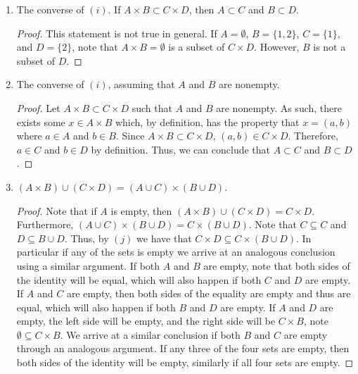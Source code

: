 \documentclass[12pt]{article}
\begin{document}
\begin{enumerate}[label=(\alph*)]
\begin{proof}
		Let $x \in A \times B$. By definition, $x = (a, b)$ such that $a \in A$ and $b \in B$.
		By assumption, we have that $a \in C$ and $b \in D$ since $A \subset C$ and 
		$B \subset D$. Therefore, we have that $(a, b) \in C \times D$. Thus, we conclude
		that $A \times B \subset C \times D$.
	\end{proof}
	\item The converse of $(i)$. If $A \times B \subset C \times D$, then 
	$A \subset C$ and $B \subset D$.
	\begin{proof}
		This statement is not true in general. If $A = \emptyset$, $B = \{1, 2\}$,
		$C = \{1\}$, and $D = \{2\}$, note that $A \times B = \emptyset$ is a subset
			of $C \times D$. However, $B$ is not a subset of $D$. 
	\end{proof}
	\item The converse of $(i)$, assuming that $A$ and $B$ are nonempty.
	\begin{proof}
		Let $A \times B \subset C \times D$ such that $A$ and $B$ are nonempty.
		As such, there exists some $x \in A \times B$ which, by definition, 
		has the property that $x = (a, b)$ where $a \in A$ and $b \in B$. Since 
		$A \times B \subset C \times D$, $(a, b) \in C \times D$. Therefore,
		$a \in C$ and $b \in D$ by definition. Thus, we can conclude that 
		$A \subset C$ and $B \subset D$.
	\end{proof}
	\item $(A \times B) \cup (C \times D) = (A \cup C) \times (B \cup D)$.
	\begin{proof}
		Note that if $A$ is empty, then $(A \times B) \cup (C \times D) = C \times D$.
		Furthermore, $(A \cup C) \times (B \cup D) = C \times (B \cup D)$. Note that 
		$C \subseteq C$ and $D \subseteq B \cup D$. Thus, by $(j)$ we have that 
		$C \times D \subseteq C \times (B \cup D)$. In particular if any of the sets is 
		empty we arrive at an analogous conclusion using a similar argument. If both 
		$A$ and $B$ are empty, note that both sides of the identity will be equal, 
		which will also happen if both $C$ and $D$ are empty. If $A$ and $C$ are empty,
		then both sides of the equality are empty and thus are equal, which will also happen
		if both $B$ and $D$ are empty. If $A$ and $D$ are empty, the left side will be empty,
		and the right side will be $C \times B$, note $\emptyset \subseteq C \times B$.
		We arrive at a similar conclusion if both $B$ and $C$ are empty through an 
		analogous argument. If any three of the four sets are empty, then both sides
		of the identity will be empty, similarly if all four sets are empty.
		

\end{proof}
\end{enumerate}
\end{document}
